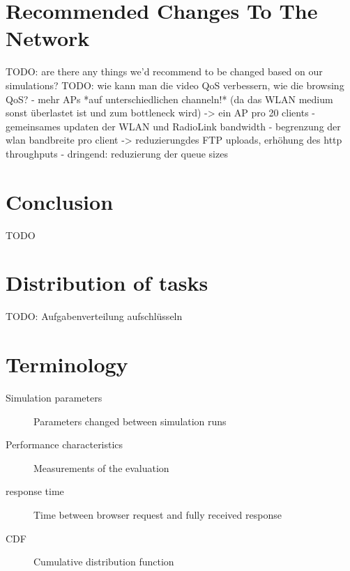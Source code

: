\documentclass[
10pt, %
a4paper, %
oneside, %
headinclude,footinclude, %
BCOR5mm, %
]{scrartcl}
\begin{document}
\section{Recommended Changes To The Network}
TODO: are there any things we'd recommend to be changed based on our simulations?
TODO: wie kann man die video QoS verbessern, wie die browsing QoS?
- mehr APs *auf unterschiedlichen channeln!* (da das WLAN medium sonst überlastet ist und zum bottleneck wird) -> ein AP pro 20 clients
- gemeinsames updaten der WLAN und RadioLink bandwidth
- begrenzung der wlan bandbreite pro client -> reduzierungdes FTP uploads, erhöhung des http throughputs
- dringend: reduzierung der queue sizes
\section{Conclusion}
TODO

\newpage

\section{Distribution of tasks}
TODO: Aufgabenverteilung aufschlüsseln

\section{Terminology}
\begin{description}
\item[Simulation parameters] Parameters changed between simulation runs
\item[Performance characteristics] Measurements of the evaluation
\item[response time] Time between browser request and fully received response
\item[CDF] Cumulative distribution function
\end{description}

\listoffigures %

\listoftables %



\renewcommand{\refname}{\spacedlowsmallcaps{References}} %




\end{document}
